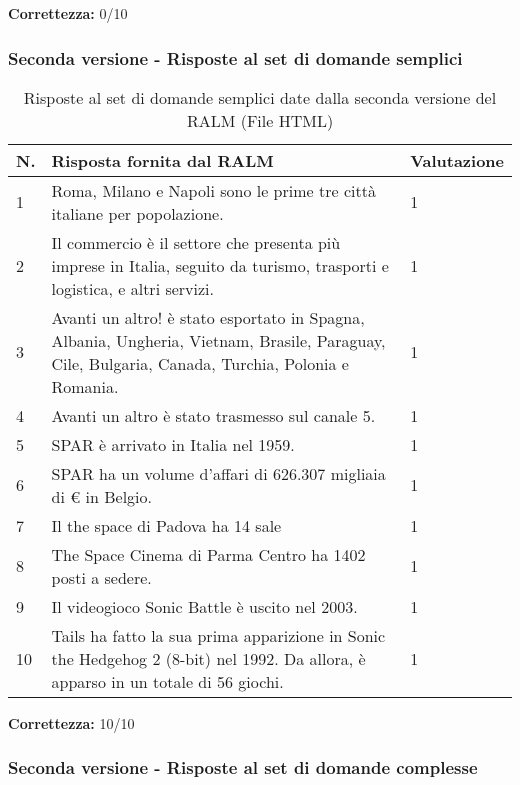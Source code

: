 \textbf{Correttezza:} 0/10

\subsubsection{Seconda versione - Risposte al set di domande semplici}

\begin{table}[H]
    \centering
    \begin{tabular}{|p{0.5cm} |p{6cm} |p{2cm}|}
        \hline
        \textbf{N}. & \textbf{Risposta fornita dal RALM} & \textbf{Valutazione} \\
        \hline
        1 & Roma, Milano e Napoli sono le prime tre città italiane per popolazione. & 1 \\
        \hline
        2 & Il commercio è il settore che presenta più imprese in Italia, seguito da turismo, trasporti e logistica, e altri servizi. & 1 \\
        \hline
        3 & Avanti un altro! è stato esportato in Spagna, Albania, Ungheria, Vietnam, Brasile, Paraguay, Cile, Bulgaria, Canada, Turchia, Polonia e Romania. & 1 \\
        \hline
        4 & Avanti un altro è stato trasmesso sul canale 5. & 1 \\
        \hline
        5 & SPAR è arrivato in Italia nel 1959. & 1 \\
        \hline
        6 & SPAR ha un volume d'affari di 626.307 migliaia di € in Belgio. & 1 \\
        \hline
        7 & Il the space di Padova ha 14 sale & 1 \\
        \hline
        8 & The Space Cinema di Parma Centro ha 1402 posti a sedere. & 1 \\
        \hline
        9 & Il videogioco Sonic Battle è uscito nel 2003. & 1 \\
        \hline
        10 & Tails ha fatto la sua prima apparizione in Sonic the Hedgehog 2 (8-bit) nel 1992. Da allora, è apparso in un totale di 56 giochi. & 1 \\
        \hline
    \end{tabular}
    \caption{Risposte al set di domande semplici date dalla seconda versione del RALM (File HTML)}
\end{table}

\textbf{Correttezza:} 10/10

\subsubsection{Seconda versione - Risposte al set di domande complesse}

